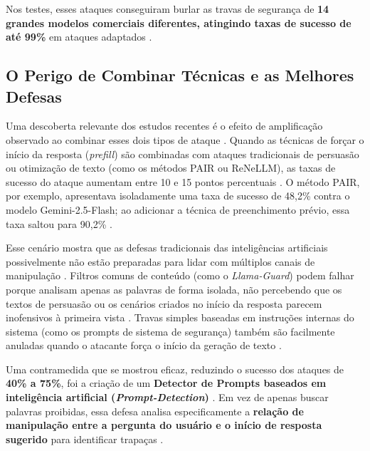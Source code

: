 Nos testes, esses ataques conseguiram burlar as travas de segurança de \textbf{14 grandes modelos comerciais diferentes, atingindo taxas de sucesso de até 99\%} em ataques adaptados \cite{li2025prefillleveljailbreakblackboxrisk}.

\subsection{O Perigo de Combinar Técnicas e as Melhores Defesas}

Uma descoberta relevante dos estudos recentes é o efeito de amplificação observado ao combinar esses dois tipos de ataque \cite{li2025prefillleveljailbreakblackboxrisk}. Quando as técnicas de forçar o início da resposta (\textit{prefill}) são combinadas com ataques tradicionais de persuasão ou otimização de texto (como os métodos PAIR ou ReNeLLM), as taxas de sucesso do ataque aumentam entre 10 e 15 pontos percentuais \cite{li2025prefillleveljailbreakblackboxrisk}. O método PAIR, por exemplo, apresentava isoladamente uma taxa de sucesso de 48,2\% contra o modelo Gemini-2.5-Flash; ao adicionar a técnica de preenchimento prévio, essa taxa saltou para 90,2\% \cite{li2025prefillleveljailbreakblackboxrisk}.

Esse cenário mostra que as defesas tradicionais das inteligências artificiais possivelmente não estão preparadas para lidar com múltiplos canais de manipulação \cite{li2025prefillleveljailbreakblackboxrisk}. Filtros comuns de conteúdo (como o \textit{Llama-Guard}) podem falhar porque analisam apenas as palavras de forma isolada, não percebendo que os textos de persuasão ou os cenários criados no início da resposta parecem inofensivos à primeira vista \cite{li2025prefillleveljailbreakblackboxrisk}. Travas simples baseadas em instruções internas do sistema (como os prompts de sistema de segurança) também são facilmente anuladas quando o atacante força o início da geração de texto \cite{li2025prefillleveljailbreakblackboxrisk}.

Uma contramedida que se mostrou eficaz, reduzindo o sucesso dos ataques de \textbf{40\% a 75\%}, foi a criação de um \textbf{Detector de Prompts baseados em inteligência artificial (\textit{Prompt-Detection})} \cite{li2025prefillleveljailbreakblackboxrisk}. Em vez de apenas buscar palavras proibidas, essa defesa analisa especificamente a \textbf{relação de manipulação entre a pergunta do usuário e o início de resposta sugerido} para identificar trapaças \cite{li2025prefillleveljailbreakblackboxrisk}.